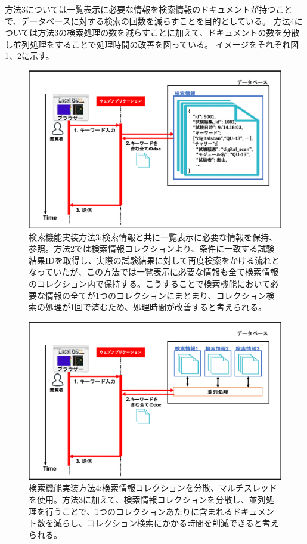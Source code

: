 方法3については一覧表示に必要な情報を検索情報のドキュメントが持つことで、データベースに対する検索の回数を減らすことを目的としている。
方法4については方法3の検索処理の数を減らすことに加えて、ドキュメントの数を分散し並列処理をすることで処理時間の改善を図っている。
イメージをそれぞれ図\ref{search_summary_hash}、\ref{search_multi_thread}に示す。

\begin{figure}[bpt]
  \begin{center}
    \includegraphics[width=12cm]{./search_summary_hash.png}
  \caption[検索機能実装方法3:検索情報と共に一覧表示に必要な情報を保持、参照]{検索機能実装方法3:検索情報と共に一覧表示に必要な情報を保持、参照。方法2では検索情報コレクションより、条件に一致する試験結果IDを取得し、実際の試験結果に対して再度検索をかける流れとなっていたが、この方法では一覧表示に必要な情報も全て検索情報のコレクション内で保持する。こうすることで検索機能において必要な情報の全てが1つのコレクションにまとまり、コレクション検索の処理が1回で済むため、処理時間が改善すると考えられる。}
  \label{search_summary_hash}
  \end{center}
\end{figure}

\begin{figure}[bpt]
  \begin{center}
    \includegraphics[width=12cm]{./search_multi_thread.png}
  \caption[検索機能実装方法4:検索情報コレクションを分散、マルチスレッドを使用]{検索機能実装方法4:検索情報コレクションを分散、マルチスレッドを使用。方法3に加えて、検索情報コレクションを分散し、並列処理を行うことで、1つのコレクションあたりに含まれるドキュメント数を減らし、コレクション検索にかかる時間を削減できると考えられる。}
  \label{search_multi_thread}
  \end{center}
\end{figure}

